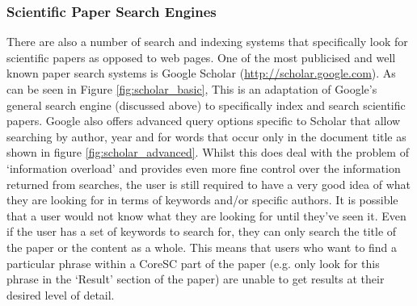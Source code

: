 \documentclass[12pt,a4paper]{article}
\begin{document}
\subsubsection{Scientific Paper Search Engines}

There are also a number of search and indexing systems that specifically look
for scientific papers as opposed to web pages. One of the most publicised and
well known paper search systems is Google Scholar
(\url{http://scholar.google.com}).  As can be seen in Figure
\ref{fig:scholar_basic}, This is an adaptation of Google's general search
engine (discussed above) to specifically index and search scientific papers.
Google also offers advanced query options specific to Scholar that allow
searching by author, year and for words that occur only in the document title
as shown in figure \ref{fig:scholar_advanced}. Whilst this does deal with the
problem of `information overload' and provides even more fine control over the
information returned from searches,  the user is still required to have a very
good idea of what they are looking for in terms of keywords and/or specific
authors. It is possible that a user would not know what they are looking for
until they've seen it. Even if the user has a set of keywords to search for,
they can only search the title of the paper or the content as a whole. This
means that users who want to find a particular phrase within a CoreSC part of
the paper (e.g. only look for this phrase in the `Result' section of the
paper) are unable to get results at their desired level of detail.
\end{document}
